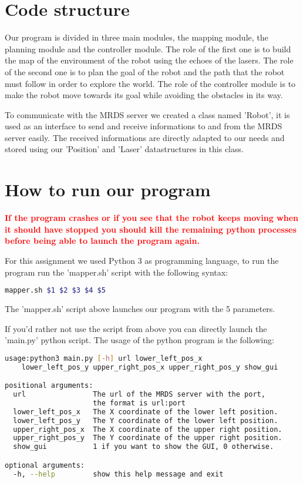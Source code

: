 \section{Code structure}

Our program is divided in three main modules, the mapping module, the planning module and the controller module.
The role of the first one is to build the map of the environment of the robot using the echoes of the lasers.
The role of the second one is to plan the goal of the robot and the path that the robot must follow in order to explore the world.
The role of the controller module is to make the robot move towards its goal while avoiding the obstacles in its way.

To communicate with the MRDS server we created a class named 'Robot', it is used as an interface to send and receive informations to and from the MRDS server easily.
The received informations are directly adapted to our needs and stored using our 'Position' and 'Laser' datastructures in this class.

\section{How to run our program}

\textcolor{red}{\textbf{If the program crashes or if you see that the robot keeps moving when it should have stopped you should kill the remaining python processes before being able to launch the program again.}}

For this assignment we used Python 3 as programming language, to run the program run the 'mapper.sh' script with the following syntax:

\begin{lstlisting}[language=bash, basicstyle=\small]
mapper.sh $1 $2 $3 $4 $5
\end{lstlisting}

The 'mapper.sh' script above launches our program with the 5 parameters.

If you'd rather not use the script from above you can directly launch the 'main.py' python script.
The usage of the python program is the following:

\begin{lstlisting}[language=bash, basicstyle=\small]
usage:python3 main.py [-h] url lower_left_pos_x 
    lower_left_pos_y upper_right_pos_x upper_right_pos_y show_gui

positional arguments:
  url                The url of the MRDS server with the port, 
                     the format is url:port
  lower_left_pos_x   The X coordinate of the lower left position.
  lower_left_pos_y   The Y coordinate of the lower left position.
  upper_right_pos_x  The X coordinate of the upper right position.
  upper_right_pos_y  The Y coordinate of the upper right position.
  show_gui           1 if you want to show the GUI, 0 otherwise.

optional arguments:
  -h, --help         show this help message and exit
\end{lstlisting}
